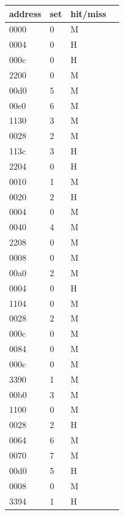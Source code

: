 \documentclass{article}
\begin{document}
\begin{table}[H]
	\centering
	\label{my-label}
	\begin{tabular}{|l|l|l|l}
		\hline
		address & set & hit/miss & \\ \hline
		0000    &  0  &    M     & \\ \hline
		0004    &  0  &    H     & \\ \hline
		000c    &  0  &    H     & \\ \hline
		2200    &  0  &    M     & \\ \hline
		00d0    &  5  &    M     & \\ \hline
		00e0    &  6  &    M     & \\ \hline
		1130    &  3  &    M     & \\ \hline
		0028    &  2  &    M     & \\ \hline
		113c    &  3  &    H     & \\ \hline
		2204    &  0  &    H     & \\ \hline
		0010    &  1  &    M     & \\ \hline
		0020    &  2  &    H     & \\ \hline
		0004    &  0  &    M     & \\ \hline
		0040    &  4  &    M     & \\ \hline
		2208    &  0  &    M     & \\ \hline
		0008    &  0  &    M     & \\ \hline
		00a0    &  2  &    M     & \\ \hline
		0004    &  0  &    H     & \\ \hline
		1104    &  0  &    M     & \\ \hline
		0028    &  2  &    M     & \\ \hline
		000c    &  0  &    M     & \\ \hline
		0084    &  0  &    M     & \\ \hline
		000c    &  0  &    M     & \\ \hline
		3390    &  1  &    M     & \\ \hline
		00b0    &  3  &    M     & \\ \hline
		1100    &  0  &    M     & \\ \hline
		0028    &  2  &    H     & \\ \hline
		0064    &  6  &    M     & \\ \hline
		0070    &  7  &    M     & \\ \hline
		00d0    &  5  &    H     & \\ \hline
		0008    &  0  &    M     & \\ \hline
		3394    &  1  &    H     & \\ \hline
	\end{tabular}
\end{table}
\end{document}
